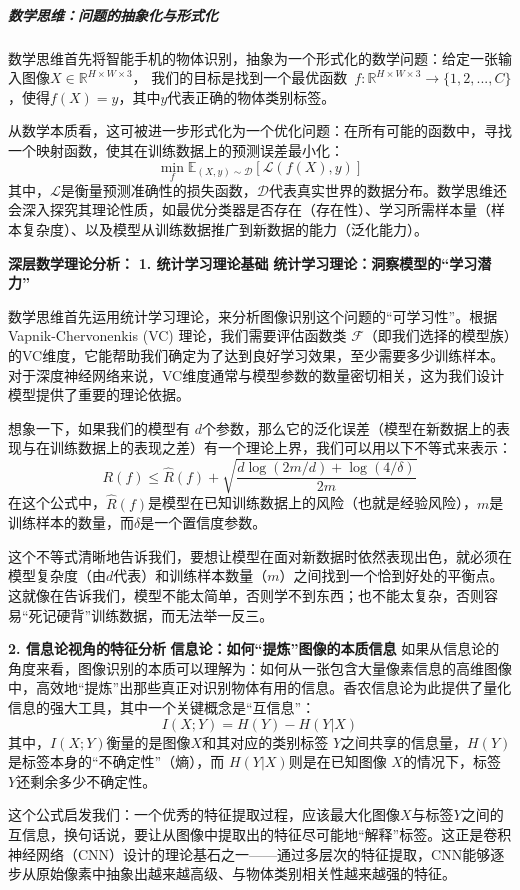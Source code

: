 \subparagraph{数学思维：问题的抽象化与形式化}

数学思维首先将智能手机的物体识别，抽象为一个形式化的数学问题：给定一张输入图像$X \in \mathbb{R}^{H \times W \times 3}$，
我们的目标是找到一个最优函数~$f: \mathbb{R}^{H \times W \times 3} \rightarrow \{1, 2, ..., C\}$，使得$f(X) = y$，其中$y$代表正确的物体类别标签。

从数学本质看，这可被进一步形式化为一个优化问题：在所有可能的函数中，寻找一个映射函数，使其在训练数据上的预测误差最小化：
$$\min_{f} \mathbb{E}_{(X,y) \sim \mathcal{D}}[\mathcal{L}(f(X), y)]$$
其中，$\mathcal{L}$是衡量预测准确性的损失函数，$\mathcal{D}$代表真实世界的数据分布。数学思维还会深入探究其理论性质，如最优分类器是否存在（存在性）、学习所需样本量（样本复杂度）、以及模型从训练数据推广到新数据的能力（泛化能力）。
 

\textbf{深层数学理论分析：}
\textbf{1. 统计学习理论基础}
\textbf{统计学习理论：洞察模型的“学习潜力”}

数学思维首先运用统计学习理论，来分析图像识别这个问题的“可学习性”。根据 Vapnik-Chervonenkis (VC) 理论，我们需要评估函数类 $\mathcal{F}$（即我们选择的模型族）的VC维度，它能帮助我们确定为了达到良好学习效果，至少需要多少训练样本。对于深度神经网络来说，VC维度通常与模型参数的数量密切相关，这为我们设计模型提供了重要的理论依据。

想象一下，如果我们的模型有 $d$个参数，那么它的泛化误差（模型在新数据上的表现与在训练数据上的表现之差）有一个理论上界，我们可以用以下不等式来表示：
$$R(f) \leq \hat{R}(f) + \sqrt{\frac{d \log(2m/d) + \log(4/\delta)}{2m}}$$
在这个公式中，$\hat{R}(f)$是模型在已知训练数据上的风险（也就是经验风险），$m$是训练样本的数量，而$\delta$是一个置信度参数。

这个不等式清晰地告诉我们，要想让模型在面对新数据时依然表现出色，就必须在模型复杂度（由$d$代表）和训练样本数量（$m$）之间找到一个恰到好处的平衡点。这就像在告诉我们，模型不能太简单，否则学不到东西；也不能太复杂，否则容易“死记硬背”训练数据，而无法举一反三。
 
 \textbf{2. 信息论视角的特征分析}
\textbf{信息论：如何“提炼”图像的本质信息}
如果从信息论的角度来看，图像识别的本质可以理解为：如何从一张包含大量像素信息的高维图像中，高效地“提炼”出那些真正对识别物体有用的信息。香农信息论为此提供了量化信息的强大工具，其中一个关键概念是“互信息”：
$$I(X; Y) = H(Y) - H(Y|X)$$
其中，$I(X; Y)$衡量的是图像$X$和其对应的类别标签 $Y$之间共享的信息量，$H(Y)$ 是标签本身的“不确定性”（熵），而 $H(Y|X)$则是在已知图像 $X$的情况下，标签 $Y$还剩余多少不确定性。

这个公式启发我们：一个优秀的特征提取过程，应该最大化图像$X$与标签$Y$之间的互信息，换句话说，要让从图像中提取出的特征尽可能地“解释”标签。这正是卷积神经网络（CNN）设计的理论基石之一——通过多层次的特征提取，CNN能够逐步从原始像素中抽象出越来越高级、与物体类别相关性越来越强的特征。

